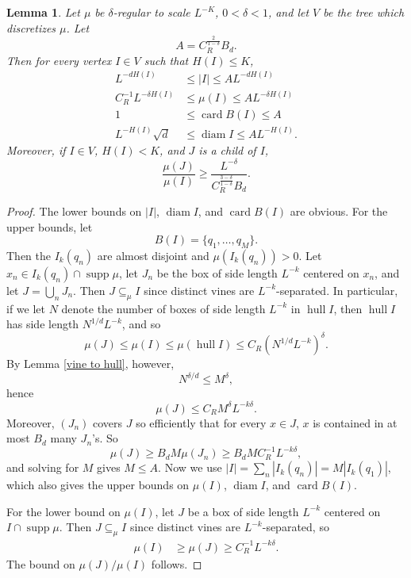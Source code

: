\documentclass[reqno,10pt]{amsart}
\DeclareMathOperator{\card}{card}
\DeclareMathOperator{\diam}{diam}
\DeclareMathOperator{\supp}{supp}
\DeclareMathOperator{\hull}{hull}
\newtheorem{lemma}[theorem]{Lemma}
\theoremstyle{definition}
\numberwithin{equation}{section}
\begin{document}
\begin{lemma}
Let $\mu$ be $\delta$-regular to scale $L^{-K}$, $0 < \delta < 1$, and let $V$ be the tree which discretizes $\mu$. Let 
$$A = C_R^{\frac{2}{1 - \delta}}B_d.$$
Then for every vertex $I \in V$ such that $H(I) \leq K$,
\begin{align}
L^{-dH(I)} &\leq |I| \leq AL^{-dH(I)} \\
C_R^{-1} L^{-\delta H(I)} &\leq \mu(I) \leq AL^{-\delta H(I)} \\
1 &\leq \card B(I) \leq A \\
L^{-H(I)} \sqrt d &\leq \diam I \leq AL^{-H(I)}.
\end{align}
Moreover, if $I \in V$, $H(I) < K$, and $J$ is a child of $I$,
\begin{equation}
\frac{\mu(J)}{\mu(I)} \geq \frac{L^{-\delta}}{C_R^{\frac{3 - \delta}{1 - \delta}} B_d}.
\end{equation}
\end{lemma}
\begin{proof}
The lower bounds on $|I|$, $\diam I$, and $\card B(I)$ are obvious. For the upper bounds, let
$$B(I) = \{q_1, \dots, q_M\}.$$
Then the $I_k(q_n)$ are almost disjoint and $\mu(I_k(q_n)) > 0$.
Let $x_n \in I_k(q_n) \cap \supp \mu$, let $J_n$ be the box of side length $L^{-k}$ centered on $x_n$, and let $J = \bigcup_n J_n$.
Then $J \subseteq_\mu I$ since distinct vines are $L^{-k}$-separated. In particular, if we let $N$ denote the number of boxes of side length $L^{-k}$ in $\hull I$, then $\hull I$ has side length $N^{1/d} L^{-k}$, and so 
$$\mu(J) \leq \mu(I) \leq \mu(\hull I) \leq C_R (N^{1/d} L^{-k})^\delta.$$
By Lemma \ref{vine to hull}, however, 
$$N^{\delta/d} \leq M^\delta,$$
hence
$$\mu(J) \leq C_R M^\delta L^{-k\delta}.$$
Moreover, $(J_n)$ covers $J$ so efficiently that for every $x \in J$, $x$ is contained in at most $B_d$ many $J_n$'s.
So
$$\mu(J) \geq B_d M\mu(J_n) \geq B_d MC_R^{-1}L^{-k\delta},$$
and solving for $M$ gives $M \leq A$.
Now we use $|I| = \sum_n |I_k(q_n)| = M|I_k(q_1)|$, which also gives the upper bounds on $\mu(I)$, $\diam I$, and $\card B(I)$.

For the lower bound on $\mu(I)$, let $J$ be a box of side length $L^{-k}$ centered on $I \cap \supp \mu$.
Then $J \subseteq_\mu I$ since distinct vines are $L^{-k}$-separated, so
\begin{align*}
\mu(I) &\geq \mu(J) \geq C_R^{-1} L^{-k\delta}.
\end{align*}
The bound on $\mu(J)/\mu(I)$ follows.
\end{proof}
\end{document}
